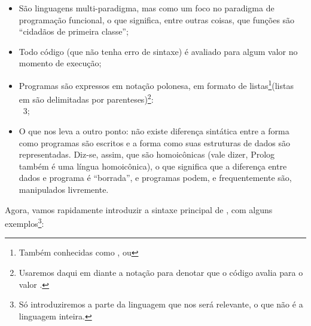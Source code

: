 \documentclass{article}
\begin{document}
\begin{itemize}
\item São linguagens multi-paradigma, mas como um
  foco no paradigma de programação funcional, o que significa, entre
  outras coisas, que  funções são ``cidadãos de primeira classe'';
\item Todo código  (que não tenha erro de sintaxe) é avaliado para
  algum valor no momento de execução;
\item Programas são expressos em notação polonesa, em formato de
  listas\footnote{Também conhecidas como , ou
    }(listas em  são delimitadas por
  parenteses)\footnote{Usaremos daqui em diante a notação
     para denotar que o código
     avalia para o valor .}:
  \\
   \seta\ 3;
\item O que nos leva a outro ponto: não existe diferença
  sintática entre a forma como programas  são escritos
  e a forma como suas estruturas de dados são representadas. Diz-se,
  assim, que  são homoicônicas (vale dizer, Prolog
  também é uma língua homoicônica), o que significa que a diferença
  entre dados e programa é ``borrada'', e programas podem, e
  frequentemente são, manipulados livremente.
\end{itemize}

Agora, vamos rapidamente introduzir a sintaxe principal de
, com alguns exemplos\footnote{Só
  introduziremos a parte da linguagem que nos será relevante, o que
  não é a linguagem inteira.}:
\end{document}

